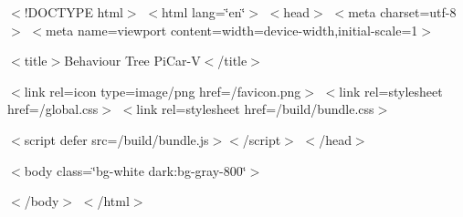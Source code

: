 \texorpdfstring{$<$}{<}!\+DOCTYPE html\texorpdfstring{$>$}{>} $<$html lang=\char`\"{}en\char`\"{}$>$ $<$head$>$ $<$meta charset=\textquotesingle{}utf-\/8\textquotesingle{}$>$ $<$meta name=\textquotesingle{}viewport\textquotesingle{} content=\textquotesingle{}width=device-\/width,initial-\/scale=1\textquotesingle{}$>$

$<$title$>$Behaviour Tree Pi\+Car-\/V$<$/title$>$

$<$link rel=\textquotesingle{}icon\textquotesingle{} type=\textquotesingle{}image/png\textquotesingle{} href=\textquotesingle{}/favicon.\+png\textquotesingle{}$>$ $<$link rel=\textquotesingle{}stylesheet\textquotesingle{} href=\textquotesingle{}/global.\+css\textquotesingle{}$>$ $<$link rel=\textquotesingle{}stylesheet\textquotesingle{} href=\textquotesingle{}/build/bundle.\+css\textquotesingle{}$>$

$<$script defer src=\textquotesingle{}/build/bundle.\+js\textquotesingle{}$>$$<$/script$>$ $<$/head$>$

$<$body class=\char`\"{}bg-\/white dark\+:bg-\/gray-\/800\char`\"{}$>$

$<$/body$>$ $<$/html$>$ 